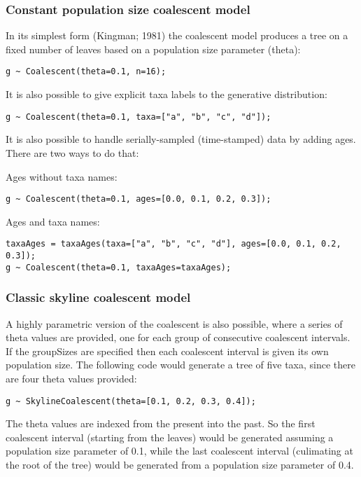 \documentclass[oneside]{article}
\begin{document}
\subsubsection{Constant population size coalescent model}

In its simplest form (Kingman; 1981) the coalescent model produces a
tree on a fixed number of leaves based on a population size parameter (theta):

\begin{verbatim}
g ~ Coalescent(theta=0.1, n=16);
\end{verbatim}

It is also possible to give explicit taxa labels to the generative
distribution: 

\begin{verbatim}
g ~ Coalescent(theta=0.1, taxa=["a", "b", "c", "d"]);
\end{verbatim}

It is also possible to handle serially-sampled (time-stamped) data by
adding ages.
There are two ways to do that: 

Ages without taxa names:

\begin{verbatim}
g ~ Coalescent(theta=0.1, ages=[0.0, 0.1, 0.2, 0.3]);
\end{verbatim}

Ages and taxa names:

\begin{verbatim}
taxaAges = taxaAges(taxa=["a", "b", "c", "d"], ages=[0.0, 0.1, 0.2,
0.3]);
g ~ Coalescent(theta=0.1, taxaAges=taxaAges);
\end{verbatim}

\subsubsection{Classic skyline coalescent model}

A highly parametric version of the coalescent is also possible, where
a series of theta values are provided, one for each group of consecutive coalescent intervals.
If the groupSizes are specified then each coalescent interval is given its
own population size.
The following code would generate a tree of five taxa, since there are four theta values provided:

\begin{verbatim}
g ~ SkylineCoalescent(theta=[0.1, 0.2, 0.3, 0.4]);
\end{verbatim}

The theta values are indexed from the present into the past.
So the first coalescent interval (starting from the leaves)
would be generated assuming a population size parameter of 0.1, while
the last coalescent interval (culimating at the root of the tree)
would be generated from a population size parameter of 0.4.
\end{document}
